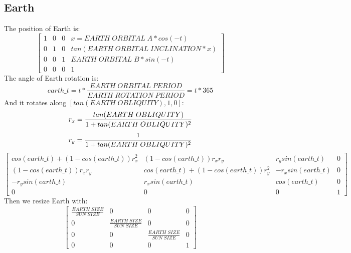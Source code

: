 \documentclass{article}
\begin{document}
\subsection*{Earth}
The position of Earth is:
\begin{equation}
  \begin{bmatrix}
    1 & 0 & 0 & x = EARTH \; ORBITAL \; A * cos(-t)          \\
    0 & 1 & 0 & tan(EARTH \; ORBITAL \; INCLINATION * x)     \\
    0 & 0 & 1 & EARTH \; ORBITAL \; B * sin(-t)              \\
    0 & 0 & 0 & 1
  \end{bmatrix}
\end{equation}
The angle of Earth rotation is:
\begin{equation}
  earth\_t = t * \frac{EARTH \; ORBITAL \; PERIOD}{EARTH \; ROTATION \; PERIOD} = t * 365
\end{equation}
And it rotates along $[tan(EARTH \; OBLIQUITY), 1, 0]$:
\begin{equation}
  r_x = \frac{tan(EARTH \; OBLIQUITY)}{1+tan(EARTH \; OBLIQUITY)^2} \\
\end{equation}
\begin{equation}
  r_y = \frac{1}{1+tan(EARTH \; OBLIQUITY)^2} \\
\end{equation}
\begin{equation}
  \begin{bmatrix}
    cos(earth\_t)+(1-cos(earth\_t))r_x^2 & (1-cos(earth\_t))r_xr_y & r_ysin(earth\_t) & 0   \\
    (1-cos(earth\_t))r_xr_y & cos(earth\_t)+(1-cos(earth\_t))r_y^2 & -r_xsin(earth\_t) & 0   \\
    -r_ysin(earth\_t) & r_xsin(earth\_t) & cos(earth\_t) & 0   \\
    0 & 0 & 0 & 1
  \end{bmatrix}
\end{equation}
Then we resize Earth with:
\begin{equation}
  \begin{bmatrix}
    \frac{EARTH \; SIZE}{SUN \; SIZE} & 0 & 0 & 0          \\
    0 & \frac{EARTH \; SIZE}{SUN \; SIZE} & 0 & 0     \\
    0 & 0 & \frac{EARTH \; SIZE}{SUN \; SIZE} & 0              \\
    0 & 0 & 0 & 1
  \end{bmatrix}
\end{equation}
\end{document}
